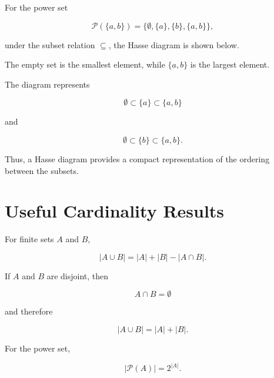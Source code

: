 \documentclass[12pt,a4paper]{article}
\begin{document}
For the power set

\[
\mathcal{P}(\{a,b\})
=
\{\emptyset,\{a\},\{b\},\{a,b\}\},
\]

under the subset relation $\subseteq$, the Hasse diagram is shown below.

\begin{center}


\end{center}

The empty set is the smallest element, while $\{a,b\}$ is the largest
element.

The diagram represents

\[
\emptyset\subset\{a\}\subset\{a,b\}
\]

and

\[
\emptyset\subset\{b\}\subset\{a,b\}.
\]

Thus, a Hasse diagram provides a compact representation of the ordering
between the subsets.


\section{Useful Cardinality Results}

For finite sets $A$ and $B$,

\[
|A\cup B|
=
|A|+|B|-|A\cap B|.
\]

If $A$ and $B$ are disjoint, then

\[
A\cap B=\emptyset
\]

and therefore

\[
|A\cup B|=|A|+|B|.
\]

For the power set,

\[
|\mathcal{P}(A)|=2^{|A|}.
\]
\end{document}
